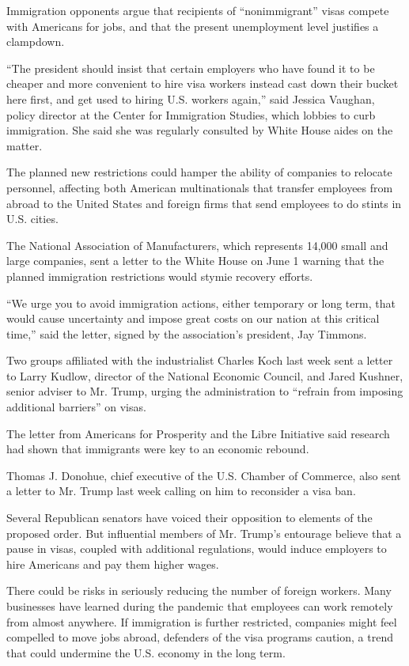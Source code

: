 Immigration opponents argue that recipients of ``nonimmigrant'' visas
compete with Americans for jobs, and that the present unemployment level
justifies a clampdown.

``The president should insist that certain employers who have found it
to be cheaper and more convenient to hire visa workers instead cast down
their bucket here first, and get used to hiring U.S. workers again,''
said Jessica Vaughan, policy director at the Center for Immigration
Studies, which lobbies to curb immigration. She said she was regularly
consulted by White House aides on the matter.

The planned new restrictions could hamper the ability of companies to
relocate personnel, affecting both American multinationals that transfer
employees from abroad to the United States and foreign firms that send
employees to do stints in U.S. cities.

The National Association of Manufacturers, which represents 14,000 small
and large companies, sent a letter to the White House on June 1 warning
that the planned immigration restrictions would stymie recovery efforts.

``We urge you to avoid immigration actions, either temporary or long
term, that would cause uncertainty and impose great costs on our nation
at this critical time,'' said the letter, signed by the association's
president, Jay Timmons.

Two groups affiliated with the industrialist Charles Koch last week sent
a letter to Larry Kudlow, director of the National Economic Council, and
Jared Kushner, senior adviser to Mr. Trump, urging the administration to
``refrain from imposing additional barriers'' on visas.

The letter from Americans for Prosperity and the Libre Initiative said
research had shown that immigrants were key to an economic rebound.

Thomas J. Donohue, chief executive of the U.S. Chamber of Commerce, also
sent a letter to Mr. Trump last week calling on him to reconsider a visa
ban.

Several Republican senators have voiced their opposition to elements of
the proposed order. But influential members of Mr. Trump's entourage
believe that a pause in visas, coupled with additional regulations,
would induce employers to hire Americans and pay them higher wages.

There could be risks in seriously reducing the number of foreign
workers. Many businesses have learned during the pandemic that employees
can work remotely from almost anywhere. If immigration is further
restricted, companies might feel compelled to move jobs abroad,
defenders of the visa programs caution, a trend that could undermine the
U.S. economy in the long term.

